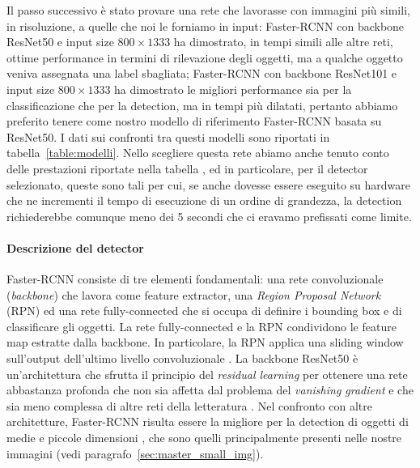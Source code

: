 Il passo successivo è stato provare una rete che lavorasse con immagini più simili, in risoluzione, a quelle che noi le forniamo in input: Faster-RCNN con backbone ResNet50 e input size $800 \times 1333$ ha dimostrato, in tempi simili alle altre reti, ottime performance in termini di rilevazione degli oggetti, ma a qualche oggetto veniva assegnata una label sbagliata; Faster-RCNN con backbone ResNet101 e input size $800 \times 1333$ ha dimostrato le migliori performance sia per la classificazione che per la detection, ma in tempi più dilatati, pertanto abbiamo preferito tenere come nostro modello di riferimento Faster-RCNN basata su ResNet50. I dati sui confronti tra questi modelli sono riportati in tabella~\ref{table:modelli}. Nello scegliere questa rete abiamo anche tenuto conto delle prestazioni riportate nella tabella \cite{modelzoo}, ed in particolare, per il detector selezionato, queste sono tali per cui, se anche dovesse essere eseguito su hardware che ne incrementi il tempo di esecuzione di un ordine di grandezza, la detection richiederebbe comunque meno dei 5 secondi che ci eravamo prefissati come limite.

\paragraph{Descrizione del detector}
Faster-RCNN consiste di tre elementi fondamentali: una rete convoluzionale (\emph{backbone}) che lavora come feature extractor, una \emph{Region Proposal Network} (RPN) ed una rete fully-connected che si occupa di definire i bounding box e di classificare gli oggetti. La rete fully-connected e la RPN condividono le feature map estratte dalla backbone. In particolare, la RPN applica una sliding window sull'output dell'ultimo livello convoluzionale \cite{frcnn}. 
La backbone ResNet50 è un'architettura che sfrutta il principio del \emph{residual learning} per ottenere una rete abbastanza profonda che non sia affetta dal problema del \emph{vanishing gradient} e che sia meno complessa di altre reti della letteratura \cite{resnet}. Nel confronto con altre architetture, Faster-RCNN risulta essere la migliore per la detection di oggetti di medie e piccole dimensioni \cite{speedaccuracy}, che sono quelli principalmente presenti nelle nostre immagini (vedi paragrafo~\ref{sec:master_small_img}).

